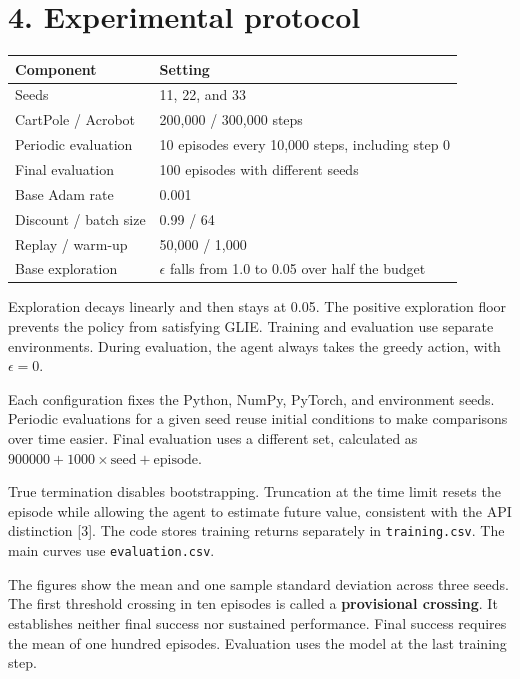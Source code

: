 \documentclass[10pt,a4paper,twocolumn]{extarticle}
\newenvironment{reporttable}
 {\par\noindent\begin{minipage}{\columnwidth}\small\renewcommand{\arraystretch}{1.13}}
 {\end{minipage}\par}
\begin{document}
\section*{4. Experimental protocol}
\begin{reporttable}
\begin{tabularx}{\linewidth}{@{}lX@{}}
\toprule
Component & Setting \\
\midrule
Seeds & 11, 22, and 33 \\
CartPole / Acrobot & 200,000 / 300,000 steps \\
Periodic evaluation & 10 episodes every 10,000 steps, including step 0 \\
Final evaluation & 100 episodes with different seeds \\
Base Adam rate & 0.001 \\
Discount / batch size & 0.99 / 64 \\
Replay / warm-up & 50,000 / 1,000 \\
Base exploration & $\epsilon$ falls from 1.0 to 0.05 over half the budget \\
\bottomrule
\end{tabularx}
\end{reporttable}

Exploration decays linearly and then stays at 0.05. The positive exploration floor prevents the policy from satisfying GLIE. Training and evaluation use separate environments. During evaluation, the agent always takes the greedy action, with $\epsilon=0$.

Each configuration fixes the Python, NumPy, PyTorch, and environment seeds. Periodic evaluations for a given seed reuse initial conditions to make comparisons over time easier. Final evaluation uses a different set, calculated as $900000 + 1000\times\text{seed} + \text{episode}$.

True termination disables bootstrapping. Truncation at the time limit resets the episode while allowing the agent to estimate future value, consistent with the API distinction [3]. The code stores training returns separately in \texttt{training.csv}. The main curves use \texttt{evaluation.csv}.

The figures show the mean and one sample standard deviation across three seeds. The first threshold crossing in ten episodes is called a \textbf{provisional crossing}. It establishes neither final success nor sustained performance. Final success requires the mean of one hundred episodes. Evaluation uses the model at the last training step.
\end{document}
